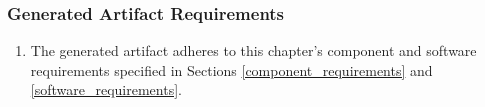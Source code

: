 \subsubsection{Generated Artifact Requirements} \label{generated_artifact_requirements}


\begin{enumerate}[label=\themycounter.\arabic*]
    \item The generated artifact adheres to this chapter's component and software
    requirements specified in Sections \ref{component_requirements} and
    \ref{software_requirements}.
\end{enumerate}
